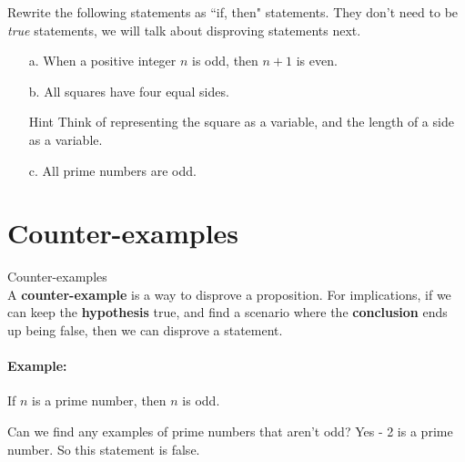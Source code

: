         \begin{questionNOGRADE}{\thequestion}
            Rewrite the following statements as ``if, then" statements.
            They don't need to be \textit{true} statements, we will talk
            about disproving statements next.

            \begin{enumerate}
                \item[a.] When a positive integer $n$ is odd, then $n+1$ is even.

                \item[b.] All squares have four equal sides.
                    \begin{hint}{Hint}
                        Think of representing the square as a variable,
                        and the length of a side as a variable.
                    \end{hint}

                \item[c.] All prime numbers are odd.

            \end{enumerate}
        \end{questionNOGRADE}

    \newpage

    \section*{Counter-examples}

        \begin{intro}{Counter-examples} ~\\
            A \textbf{counter-example} is a way to disprove a proposition.
            For implications, if we can keep the \textbf{hypothesis} true,
            and find a scenario where the \textbf{conclusion} ends up being false,
            then we can disprove a statement.

            \paragraph{Example:}
            If $n$ is a prime number, then $n$ is odd.

            Can we find any examples of prime numbers that aren't odd?
            Yes - 2 is a prime number. So this statement is false.
        \end{intro}

